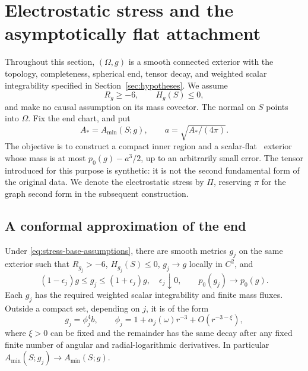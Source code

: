 \section{Electrostatic stress and the asymptotically flat attachment}
\label{sec:stress-extension}

Throughout this section, $(\Omega,g)$ is a smooth connected exterior with
the topology, completeness, spherical end, tensor decay, and weighted
scalar integrability specified in Section~\ref{sec:hypotheses}.  We assume
\begin{equation}
 R_g\ge-6,\qquad H_g(S)\le0,
 \label{eq:stress-base-assumptions}
\end{equation}
and make no causal assumption on its mass covector.  The normal on $S$
points into $\Omega$.  Fix the end chart, and put
\begin{equation}
 A_* = A_{\min}(S;g),\qquad a=\sqrt{A_*/(4\pi)}.
 \label{eq:stress-area-radius}
\end{equation}
The objective is to construct a compact inner region and a scalar-flat
\AF\ exterior whose mass is at most $p_0(g)-a^3/2$, up to an arbitrarily
small error.  The tensor introduced for this purpose is synthetic: it is
not the second fundamental form of the original data.  We denote the
electrostatic stress by $\Pi$, reserving $\pi$ for the graph second form in
the subsequent construction.

\subsection{A conformal approximation of the end}

\begin{proposition}
\label{prop:conformal-approximation}
Under \eqref{eq:stress-base-assumptions}, there are smooth metrics $g_j$
on the same exterior such that $R_{g_j}>-6$, $H_{g_j}(S)\le0$,
$g_j\to g$ locally in $C^2$, and
\begin{equation}
 (1-\epsilon_j)g\le g_j\le(1+\epsilon_j)g,
 \quad \epsilon_j\downarrow0,
 \qquad p_0(g_j)\longrightarrow p_0(g).
 \label{eq:stress-density-convergence}
\end{equation}
Each $g_j$ has the required weighted scalar integrability and finite mass
fluxes.  Outside a compact set, depending on $j$, it is of the form
\begin{equation}
 g_j=\phi_j^4 b,\qquad
 \phi_j=1+\alpha_j(\omega)r^{-3}+O(r^{-3-\xi}),
 \label{eq:stress-conformal-end}
\end{equation}
where $\xi>0$ can be fixed and the remainder has the same decay after
any fixed finite number of angular and radial-logarithmic derivatives.
In particular $A_{\min}(S;g_j)\to A_{\min}(S;g)$.
\end{proposition}

